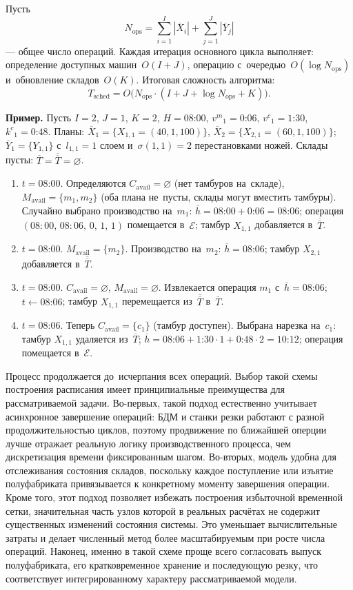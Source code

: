 Пусть
\[
N_{\mathrm{ops}}=\sum_{i=1}^{I}|\overline{X}_i|+\sum_{j=1}^{J}|\overline{Y}_j|
\]
--- общее число операций.
Каждая итерация основного цикла выполняет: определение доступных машин~$O(I+J)$, операцию с~очередью~$O(\log N_{\mathrm{ops}})$ и~обновление складов~$O(K)$.
Итоговая сложность алгоритма:
\[
T_{\mathrm{sched}} = O\bigl(N_{\mathrm{ops}}\cdot(I+J+\log N_{\mathrm{ops}}+K)\bigr).
\]

\textbf{Пример.}
Пусть $I=2$, $J=1$, $K=2$, $H=\text{08:00}$, ${v^m}_1=\text{0:06}$, ${v^c}_1=\text{1:30}$, ${k^c}_1=\text{0:48}$.
Планы: $\overline{X}_1=\{X_{1,1}=(40,1,100)\}$, $\overline{X}_2=\{X_{2,1}=(60,1,100)\}$; $\overline{Y}_1=\{Y_{1,1}\}$ с~$l_{1,1}=1$ слоем и~$\sigma(1,1)=2$ перестановками ножей.
Склады пусты: $\overline{T}=\overline{\overline{T}}=\varnothing$.

\begin{enumerate}
\item $t=\text{08:00}$. Определяются $C_{\mathrm{avail}}=\varnothing$ (нет тамбуров на~складе), $M_{\mathrm{avail}}=\{m_1,m_2\}$ (оба плана не~пусты, склады могут вместить тамбуры).
Случайно выбрано производство на~$m_1$: $\overline{h}=\text{08:00}+\text{0:06}=\text{08:06}$; операция $(08\!:\!00,\,08\!:\!06,\,0,\,1,\,1)$ помещается в~$\mathcal{E}$; тамбур $X_{1,1}$ добавляется в~$\overline{\overline{T}}$.
\item $t=\text{08:00}$. $M_{\mathrm{avail}}=\{m_2\}$. Производство на~$m_2$: $\overline{h}=\text{08:06}$; тамбур $X_{2,1}$ добавляется в~$\overline{\overline{T}}$.
\item $t=\text{08:00}$. $C_{\mathrm{avail}}=\varnothing$, $M_{\mathrm{avail}}=\varnothing$. Извлекается операция $m_1$ с~$\overline{h}=\text{08:06}$; $t\leftarrow\text{08:06}$; тамбур $X_{1,1}$ перемещается из~$\overline{\overline{T}}$ в~$\overline{T}$.
\item $t=\text{08:06}$. Теперь $C_{\mathrm{avail}}=\{c_1\}$ (тамбур доступен). Выбрана нарезка на~$c_1$: тамбур $X_{1,1}$ удаляется из~$\overline{T}$; $\overline{h}=\text{08:06}+\text{1:30}\cdot 1+\text{0:48}\cdot 2=\text{10:12}$; операция помещается в~$\mathcal{E}$.
\end{enumerate}
Процесс продолжается до~исчерпания всех операций.
Выбор такой схемы построения расписания имеет принципиальные преимущества для рассматриваемой задачи. Во-первых, такой подход естественно учитывает асинхронное завершение операций: БДМ и станки резки работают с разной продолжительностью циклов, поэтому продвижение по ближайшей оперции лучше отражает реальную логику производственного процесса, чем дискретизация времени фиксированным шагом. Во-вторых, модель удобна для отслеживания состояния складов, поскольку каждое поступление или изъятие полуфабриката привязывается к конкретному моменту завершения операции.
Кроме того, этот подход позволяет избежать построения избыточной временной сетки, значительная часть узлов которой в реальных расчётах не содержит существенных изменений состояния системы. Это уменьшает вычислительные затраты и делает численный метод более масштабируемым при росте числа операций. Наконец, именно в такой схеме проще всего согласовать выпуск полуфабриката, его кратковременное хранение и последующую резку, что соответствует интегрированному характеру рассматриваемой модели.

